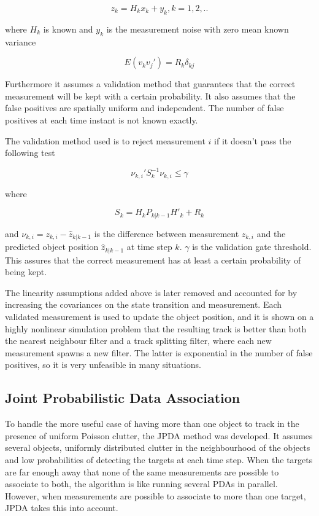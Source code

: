 \begin{equation}
    z_k = H_kx_k + y_k, k = 1,2,..
\end{equation}

where $H_k$ is known and $y_k$ is the measurement noise with zero mean known variance 

\begin{equation}
    E(v_kv_j') = R_k\delta_{kj}
\end{equation}



Furthermore it assumes a validation method that guarantees that the correct measurement will be kept with a certain probability. It also assumes that the false positives are spatially uniform and independent. The number of false positives at each time instant is not known exactly.   

The validation method used is to reject measurement $i$ if it doesn't pass the following test

\begin{equation}
    \nu_{k,i}'S_k^{-1}\nu_{k,i} \leq \gamma
\end{equation}

where 

\begin{equation}
    S_k = H_kP_{k|k-1}H'_k+R_k
\end{equation}

and $\nu_{k,i} = z_{k,i} - \hat{z}_{k|k-1}$ is the difference between measurement $z_{k,i}$ and the predicted object position $\hat{z}_{k|k-1}$ at time step $k$. $\gamma$ is the validation gate threshold. This assures that the correct measurement has at least a certain probability of being kept. 

The linearity assumptions added above is later removed and accounted for by increasing the covariances on the state transition and measurement. Each validated measurement is used to update the object position, and it is shown on a highly nonlinear simulation problem that the resulting track is better than both the nearest neighbour filter and a track splitting filter, where each new measurement spawns a new filter. The latter is exponential in the number of false positives, so it is very unfeasible in many situations. 

\subsection{Joint Probabilistic Data Association}

To handle the more useful case of having more than one object to track in the presence of uniform Poisson clutter, the \gls{JPDA} method was developed\cite{JPDA}. It assumes several objects, uniformly distributed clutter in the neighbourhood of the objects and low probabilities of detecting the targets at each time step. When the targets are far enough away that none of the same measurements are possible to associate to both, the algorithm is like running several \glspl{PDA} in parallel. However, when measurements are possible to associate to more than one target, \gls{JPDA} takes this into account. 

